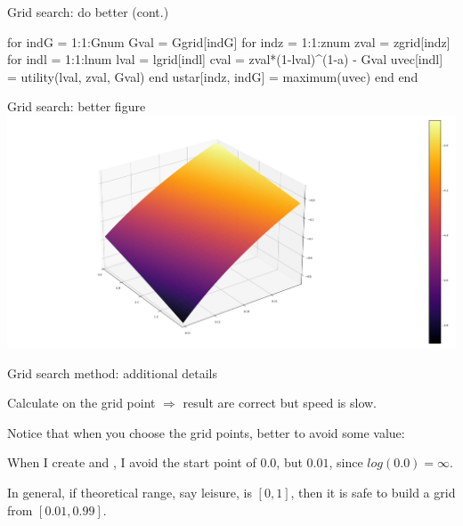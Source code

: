\documentclass[11pt,aspectratio=43,usenames,dvipsnames]{beamer}
\theoremstyle{definition}
\begin{document}
\begin{frame}[fragile]{Grid search: do better (cont.)}
\label{slide:Grid_search__do_better__cont_}

\begin{juliacode}
    for indG = 1:1:Gnum
        Gval = Ggrid[indG]
        for indz = 1:1:znum
            zval = zgrid[indz]
            for indl = 1:1:lnum
                lval = lgrid[indl]
                cval = zval*(1-lval)^(1-a) - Gval
                uvec[indl] = utility(lval, zval, Gval)
            end
            ustar[indz, indG] = maximum(uvec)
        end
    end
\end{juliacode}


\end{frame}

\begin{frame}{Grid search: better figure}
\label{slide:grid_search__better_figure}
    \includegraphics[width=\textwidth]{./figures/utilitygov_better.png}
\end{frame}

\begin{frame}{Grid search method: additional details}
\label{slide:Grid_search_method__additional_details}

Calculate on the grid point $ \Rightarrow  $ result are correct but speed is slow.

Notice that when you choose the grid points, better to avoid some value:

\begin{example}
When I create  and , I avoid the start point of $ 0.0 $, but $ 0.01 $, since $ log(0.0) = \infty $.
\end{example}

In general, if theoretical range, say leisure, is $ [0, 1] $, then it is safe to build a grid from $ [0.01, 0.99] $.

\end{frame}
\end{document}
